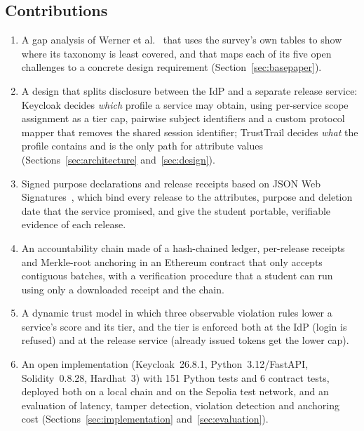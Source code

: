 \subsection{Contributions}
\begin{enumerate}
\item A gap analysis of Werner et al.~\cite{werner2017survey} that uses the survey's own tables to show where its taxonomy is least covered, and that maps each of its five open challenges to a concrete design requirement (Section~\ref{sec:basepaper}).
\item A design that splits disclosure between the IdP and a separate release service: Keycloak decides \emph{which} profile a service may obtain, using per-service scope assignment as a tier cap, pairwise subject identifiers and a custom protocol mapper that removes the shared session identifier; TrustTrail decides \emph{what} the profile contains and is the only path for attribute values (Sections~\ref{sec:architecture} and~\ref{sec:design}).
\item Signed purpose declarations and release receipts based on JSON Web Signatures~\cite{rfc7515}, which bind every release to the attributes, purpose and deletion date that the service promised, and give the student portable, verifiable evidence of each release.
\item An accountability chain made of a hash-chained ledger, per-release receipts and Merkle-root anchoring in an Ethereum contract that only accepts contiguous batches, with a verification procedure that a student can run using only a downloaded receipt and the chain.
\item A dynamic trust model in which three observable violation rules lower a service's score and its tier, and the tier is enforced both at the IdP (login is refused) and at the release service (already issued tokens get the lower cap).
\item An open implementation (Keycloak~26.8.1, Python~3.12/FastAPI, Solidity~0.8.28, Hardhat~3) with 151 Python tests and 6 contract tests, deployed both on a local chain and on the Sepolia test network, and an evaluation of latency, tamper detection, violation detection and anchoring cost (Sections~\ref{sec:implementation} and~\ref{sec:evaluation}).
\end{enumerate}

